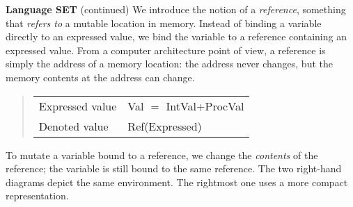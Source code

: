 \begin{minipage}[t]{\sw}
\slidenumber
\LARGE
{\bf Language SET} (continued)\exx
We introduce the notion of a {\em reference},
something that {\em refers to} a mutable location in memory.
Instead of binding a variable directly to an expressed value,
we bind the variable to a reference containing an expressed value.
From a computer architecture point of view,
a reference is simply the address of a memory location:
the address never changes,
but the memory contents at the address can change.
\begin{quote}
\begin{tabular}{@{}l@{ $=$ }l}
Expressed value & Val $=$ IntVal+ProcVal \\
Denoted value & Ref(Expressed) \\
\end{tabular}
\end{quote}
To mutate a variable bound to a reference,
we change the {\em contents} of the reference;
the variable is still bound to the same reference.
\vspace{2ex}
The two right-hand diagrams depict the same environment.
The rightmost one uses a more compact representation.
\end{minipage}
\clearpage
